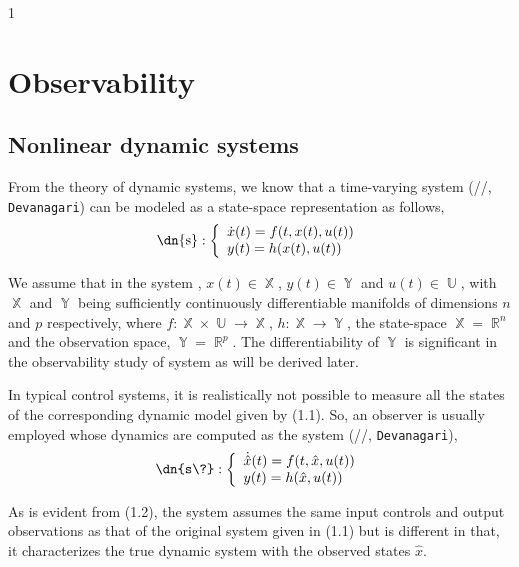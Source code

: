 \documentclass[footsepline,footinclude=false,oneside,fontsize=11pt,paper=a4,listof=totoc,bibliography=totoc]{report} %
\DeclareMathOperator{\X}{\mathbb{X}}
\DeclareMathOperator{\Y}{\mathbb{Y}}
\DeclareMathOperator{\Ui}{\mathbb{U}}
\DeclareMathOperator{\R}{\mathbb{R}}
\begin{document}
\newcommand{\dev}{\dn}{1}

\chapter{Observability}\label{chapter:Observability}

\section{Nonlinear dynamic systems}
From the theory of dynamic systems, we know that a time-varying system {\dev{s}} (/\textit{{}}/, {\small{\texttt{Devanagari}}}) can be modeled as a state-space representation as follows,\\
\begin{equation}
\text{\dev{s}}:
	\left\{
		\begin{array}{lr}
		 \dot{x}(t)=f(t,x(t),u(t))\\		 
		 y(t) = h(x(t),u(t))
		\end{array}
	\right.
\end{equation}

We assume that in the system {\dev{s}}, $x(t) \in \X$, $y(t) \in \Y$ and $u(t) \in \Ui$, with $\X$ and $\Y$ being sufficiently continuously differentiable manifolds of dimensions $n$ and $p$ respectively, where $f:\X \times \Ui \xrightarrow{} \X$, $h:\X \xrightarrow{} \Y$, the state-space $\X = \R^n$ and the observation space, $\Y = \R^p$. The differentiability of $\Y$ is significant in the observability study of system {\dev{s}} as will be derived later. 

In typical control systems, it is realistically not possible to measure all the states of the corresponding dynamic model given by (1.1). So, an observer is usually employed whose dynamics are computed as the system {\dev{s\?}} (/\textit{{}}/, {\small{\texttt{Devanagari}}}),
\begin{equation}
\text{{{\dev{s\?}}}}:
	\left\{
		\begin{array}{lr}
		 \dot{\hat{x}}(t)=f(t,\hat{x},u(t))\\		 
		 y(t) = h(\hat{x},u(t))
		\end{array}
	\right.
\end{equation}

As is evident from (1.2), the system {\dev{s\?}} assumes the same input controls and output observations as that of the original system given in (1.1) but is different in that, it characterizes the true dynamic system with the observed states $\hat{x}$. 
\end{document}
